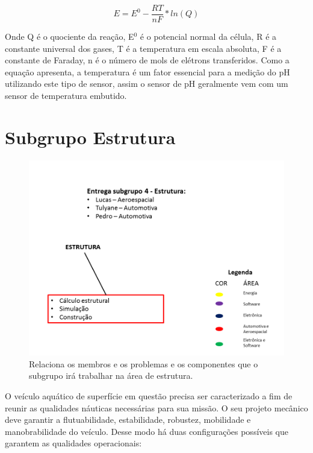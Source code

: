 \begin{equation}
    E= E^{0} - \frac{RT}{nF} * ln(Q)
\end{equation}

Onde Q é o quociente da reação, E$^{0}$ é o potencial normal da célula, R é a constante universal dos gases, T é a temperatura em escala absoluta, F é a constante de Faraday, n é o número de mols de elétrons transferidos. Como a equação apresenta, a temperatura é um fator essencial para a medição do pH utilizando este tipo de sensor, assim o sensor de pH geralmente vem com um sensor de temperatura embutido.




\section{Subgrupo Estrutura}

\begin{figure} [!htp]
	\centering
	\includegraphics[scale=0.6]{figuras/subgrupoestrutura}
	\caption{Relaciona os membros e os problemas e os componentes que o subgrupo irá trabalhar na área de estrutura.}
	\label{subgrupoestrutura}
\end{figure}
\FloatBarrier

O veículo aquático de superfície em questão precisa ser caracterizado a fim de reunir as qualidades náuticas necessárias para sua missão. O seu projeto mecânico deve garantir a flutuabilidade, estabilidade, robustez, mobilidade e manobrabilidade do veículo. Desse modo há duas configurações possíveis que garantem as qualidades operacionais:

